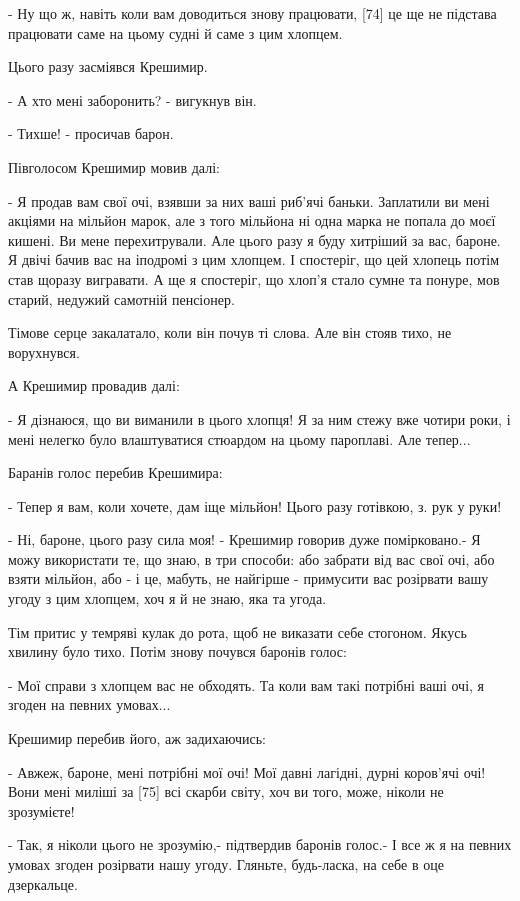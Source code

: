 - Ну що ж, навіть коли вам доводиться знову працювати, [74] це ще не підстава працювати саме на цьому судні й саме з цим хлопцем.

Цього разу засміявся Крешимир.

- А хто мені заборонить? - вигукнув він.

- Тихше! - просичав барон.

Півголосом Крешимир мовив далі:

- Я продав вам свої очі, взявши за них ваші риб'ячі баньки. Заплатили ви мені акціями на мільйон марок, але з того мільйона ні одна марка не попала до моєї кишені. Ви мене перехитрували. Але цього разу я буду хитріший за вас, бароне. Я двічі бачив вас на іподромі з цим хлопцем. І спостеріг, що цей хлопець потім став щоразу вигравати. А ще я спостеріг, що хлоп'я стало сумне та понуре, мов старий, недужий самотній пенсіонер.

Тімове серце закалатало, коли він почув ті слова. Але він стояв тихо, не ворухнувся.

А Крешимир провадив далі:

- Я дізнаюся, що ви виманили в цього хлопця! Я за ним стежу вже чотири роки, і мені нелегко було влаштуватися стюардом на цьому пароплаві. Але тепер...

Баранів голос перебив Крешимира:

- Тепер я вам, коли хочете, дам іще мільйон! Цього разу готівкою, з. рук у руки!

- Ні, бароне, цього разу сила моя! - Крешимир говорив дуже помірковано.- Я можу використати те, що знаю, в три способи: або забрати від вас свої очі, або взяти мільйон, або - і це, мабуть, не найгірше - примусити вас розірвати вашу угоду з цим хлопцем, хоч я й не знаю, яка та угода.

Тім притис у темряві кулак до рота, щоб не виказати себе стогоном. Якусь хвилину було тихо. Потім знову почувся баронів голос:

- Мої справи з хлопцем вас не обходять. Та коли вам такі потрібні ваші очі, я згоден на певних умовах...

Крешимир перебив його, аж задихаючись:

- Авжеж, бароне, мені потрібні мої очі! Мої давні лагідні, дурні коров'ячі очі! Вони мені миліші за [75] всі скарби світу, хоч ви того, може, ніколи не зрозумієте!

- Так, я ніколи цього не зрозумію,- підтвердив баронів голос.- І все ж я на певних умовах згоден розірвати нашу угоду. Гляньте, будь-ласка, на себе в оце дзеркальце.

